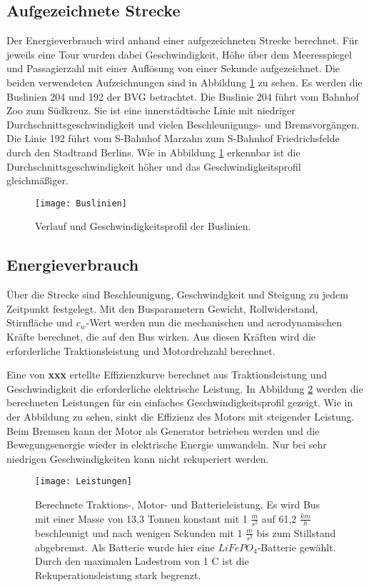 \subsection{Aufgezeichnete Strecke}
Der Energieverbrauch wird anhand einer aufgezeichneten Strecke berechnet. Für jeweils eine Tour wurden dabei Geschwindigkeit, Höhe über dem Meeresspiegel und Passagierzahl mit einer Auflösung von einer Sekunde aufgezeichnet. Die beiden verwendeten Aufzeichnungen sind in Abbildung \ref{Buslinien} zu sehen. Es werden die Buslinien 204 und 192 der BVG betrachtet. Die Buslinie 204 führt vom Bahnhof Zoo zum Südkreuz. Sie ist eine innerstädtische Linie mit niedriger Durchschnittsgeschwindigkeit und vielen Beschleunigungs- und Bremsvorgängen. Die Linie 192 führt vom S-Bahnhof Marzahn zum S-Bahnhof Friedrichsfelde durch den Stadtrand Berlins. Wie in Abbildung \ref{Buslinien} erkennbar ist die Durchschnittsgeschwindigkeit höher und das Geschwindigkeitsprofil gleichmäßiger.
\begin{figure}\centering
	\texttt{[image: Buslinien]}
	\caption[Verlauf und Geschwindigkeitsprofil der Buslinien]{Verlauf und Geschwindigkeitsprofil der Buslinien.}
	\label{Buslinien}
\end{figure}

\subsection{Energieverbrauch}
Über die Strecke sind Beschleunigung, Geschwindgkeit und Steigung zu jedem Zeitpunkt festgelegt. Mit den Busparametern Gewicht, Rollwiderstand, Stirnfläche und $c_w$-Wert werden nun die mechanischen und aerodynamischen Kräfte berechnet, die auf den Bus wirken. Aus diesen Kräften wird die erforderliche Traktionsleistung und Motordrehzahl berechnet.

Eine von \textbf{xxx} ertellte Effizienzkurve berechnet aus Traktionsleistung und Geschwindigkeit die erforderliche elektrische Leistung. In Abbildung \ref{abb_Leistungen} werden die berechneten Leistungen für ein einfaches Geschwindigkeitsprofil gezeigt. Wie in der Abbildung zu sehen, sinkt die Effizienz des Motors mit steigender Leistung. Beim Bremsen kann der Motor als Generator betrieben werden und die Bewegungsenergie wieder in elektrische Energie umwandeln. Nur bei sehr niedrigen Geschwindigkeiten kann nicht rekuperiert werden.
\begin{figure}\centering
	\texttt{[image: Leistungen]}
	\caption[Berechnete Traktions-, Motor- und Batterieleistung]{Berechnete Traktions-, Motor- und Batterieleistung. Es wird Bus mit einer Masse von 13,3 Tonnen konstant mit 1 $\frac{m}{s^2}$ auf 61,2 $\frac{km}{h}$ beschleunigt und nach wenigen Sekunden mit 1 $\frac{m}{s^2}$ bis zum Stillstand abgebremst. Als Batterie wurde hier eine $LiFePO_4$-Batterie gewählt. Durch den maximalen Ladestrom von 1 C ist die Rekuperationsleistung stark begrenzt.}
	\label{abb_Leistungen}
\end{figure}

